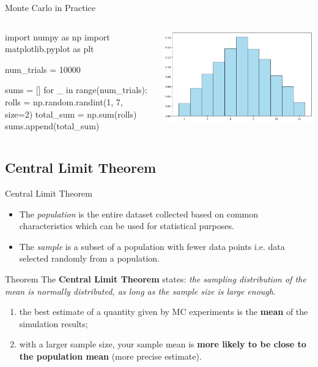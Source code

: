 \documentclass{beamer}
\begin{document}
\begin{frame}[fragile]{Monte Carlo in Practice}
\begin{columns}
\begin{ipython}
import numpy as np
import matplotlib.pyplot as plt

num_trials = 10000

sums = []
for _ in range(num_trials):
    rolls = np.random.randint(1, 7, size=2)
    total_sum = np.sum(rolls)
    sums.append(total_sum)
\end{ipython}
    \begin{center}
    \includegraphics[width=0.8\linewidth]{images/sum_two_dice}
    \end{center}
\end{columns}
\end{frame}

\subsection{Central Limit Theorem}
\begin{frame}{Central Limit Theorem}
\begin{itemize}
\item The \emph{population} is the entire dataset collected based on common characteristics which can be used for statistical purposes.
\item The \emph{sample} is a subset of a population with fewer data points i.e. data selected randomly from a population.
\end{itemize}
\begin{block}{Theorem}
The \textbf{Central Limit Theorem} states: \emph{the sampling distribution of the mean is normally distributed, as long as the sample size is large enough}.
	
\begin{enumerate}
    \item the best estimate of a quantity given by MC experiments is the \textbf{mean} of the simulation results;
    \item with a larger sample size, your sample mean is \textbf{more likely to be close to the population mean} (more precise estimate).
\end{enumerate}
\end{block}
\end{frame}
\end{document}
